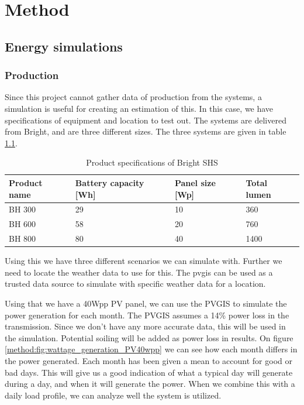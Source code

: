 
\chapter{Method}
\label{ch:method}


\section{Energy simulations}
\subsection{Production}
Since this project cannot gather data of production from the systems, a simulation is useful for creating an estimation of this. In this case, we have specifications of equipment and location to test out. The systems are delivered from Bright, and are three different sizes. The three systems are given in table \ref{table:product_specifications}. 

\begin{table}[h]
\centering
\begin{tabularx}{\textwidth}{|X|X|X|X|}
\hline
\textbf{Product name} & \textbf{Battery capacity [Wh]} & \textbf{Panel size [Wp]} & \textbf{Total lumen} \\ \hline
BH 300                &            29                    &          10                 &         360               \\ \hline
BH 600                &              58                  &          20                 &           760             \\ \hline
BH 800                &              80                  &         40                  &            1400            \\ \hline
\end{tabularx}
\caption{Product specifications of Bright SHS}
\label{table:product_specifications}
\end{table}

Using this we have three different scenarios we can simulate with. Further we need to locate the weather data to use for this. The \acrfull{pvgis} can be used as a trusted data source to simulate with specific weather data for a location\citep{huldNewSolarRadiation2012}.

Using that we have a 40Wpp PV panel, we can use the PVGIS to simulate the power generation for each month. The PVGIS assumes a 14\% power loss in the transmission. Since we don't have any more accurate data, this will be used in the simulation. Potential soiling will be added as power loss in results. On figure \ref{method:fig:wattage_generation_PV40wpp} we can see how each month differs in the power generated. Each month has been given a mean to account for good or bad days. This will give us a good indication of what a typical day will generate during a day, and when it will generate the power. When we combine this with a daily load profile, we can analyze well the system is utilized. 


